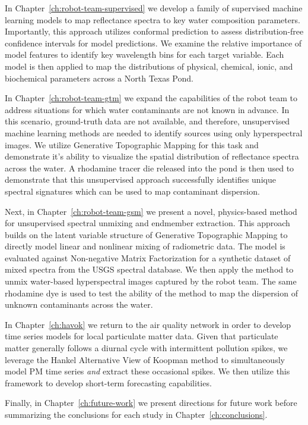 In Chapter~\ref{ch:robot-team-supervised} we develop a family of supervised
machine learning models to map reflectance spectra to key water composition
parameters. Importantly, this approach utilizes conformal prediction
to assess distribution-free confidence intervals for model predictions. We
examine the relative importance of model features to identify key wavelength
bins for each target variable. Each model is then applied to map the
distributions of physical, chemical, ionic, and biochemical parameters across a
North Texas Pond.

In Chapter~\ref{ch:robot-team-gtm} we expand the capabilities of the robot team
to address situations for which water contaminants are not known in advance. In
this scenario, ground-truth data are not available, and therefore, unsupervised
machine learning methods are needed to identify sources using only hyperspectral
images. We utilize Generative Topographic Mapping for this task and demonstrate
it's ability to visualize the spatial distribution of reflectance spectra across
the water. A rhodamine tracer die released into the pond is then used to
demonstrate that this unsupervised approach successfully identifies unique
spectral signatures which can be used to map contaminant dispersion.

Next, in Chapter~\ref{ch:robot-team-gsm} we present a novel, physics-based
method for unsupervised spectral unmixing and endmember extraction.
This approach builds on the latent variable structure of Generative Topographic
Mapping to directly model linear and nonlinear mixing of radiometric data.
The model is evaluated against Non-negative Matrix Factorization for a
synthetic dataset of mixed spectra from the USGS spectral database. We then
apply the method to unmix water-based hyperspectral images captured by the robot
team. The same rhodamine dye is used to test the ability of the method to map
the dispersion of unknown contaminants across the water.

In Chapter~\ref{ch:havok} we return to the air quality network in order to develop time
series models for local particulate matter data. Given that particulate matter
generally follows a diurnal cycle with intermittent pollution spikes, we
leverage the Hankel Alternative View of Koopman method to simultaneously model
PM time series \textit{and} extract these occasional spikes. We then utilize
this framework to develop short-term forecasting capabilities.

Finally, in Chapter~\ref{ch:future-work} we present directions for future work
before summarizing the conclusions for each study in
Chapter~\ref{ch:conclusions}.



